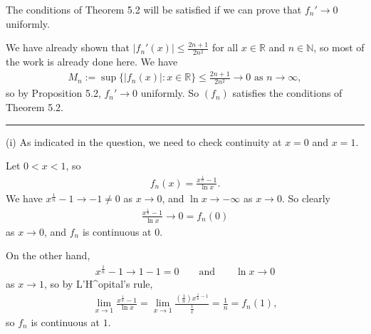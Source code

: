 \documentclass[letterpaper,10pt,english]{jupyterBook}
\begin{document}
The conditions of Theorem 5.2 will be satisfied if we can prove that \(f_n'\rightarrow 0\) uniformly.

We have already shown that \(|f_n'(x)|\leq \frac{2n+1}{2n^2}\) for all \(x\in\mathbb{R}\) and \(n\in\mathbb{N}\), so most of the work is already done here. We have
\begin{equation*}
\begin{split}
M_n := \sup\{|f_n(x)|:x\in\mathbb{R}\} \leq \frac{2n+1}{2n^2}\rightarrow 0 \text{ as } n\rightarrow\infty,
\end{split}
\end{equation*}
\sphinxAtStartPar
so by Proposition 5.2, \(f_n'\rightarrow 0\) uniformly. So \((f_n)\) satisfies the conditions of Theorem 5.2.


\bigskip\hrule\bigskip


\sphinxAtStartPar
{\hyperref[\detokenize{Problems:id59}]{}}
(i) As indicated in the question, we need to check continuity at \(x=0\) and \(x=1\).

Let \(0<x<1\), so
\begin{equation*}
\begin{split}
f_n(x) = \frac{x^{\frac{1}{n}}-1}{\ln x}.
\end{split}
\end{equation*}
\sphinxAtStartPar
We have \(x^{\frac{1}{n}} -1 \rightarrow -1 \neq 0\) as \(x\rightarrow 0\), and \(\ln x\rightarrow -\infty\) as \(x\rightarrow 0\). So clearly
\begin{equation*}
\begin{split}
\frac{x^{\frac{1}{n}}-1}{\ln x} \rightarrow 0 =f_n(0)
\end{split}
\end{equation*}
\sphinxAtStartPar
as \(x\rightarrow 0\), and \(f_n\) is continuous at \(0\).

On the other hand,
\begin{equation*}
\begin{split}
x^{\frac{1}{n}} -1 \rightarrow 1-1=0 \qquad \text{and}\qquad \ln x\rightarrow 0
\end{split}
\end{equation*}
\sphinxAtStartPar
as \(x\rightarrow 1\), so by L’H\textasciicircum{}opital’s rule,
\begin{equation*}
\begin{split}
\lim_{x\rightarrow 1} \frac{x^{\frac{1}{n}} -1}{\ln x} = \lim_{x\rightarrow 1} \frac{\left(\frac{1}{n}\right)x^{\frac{1}{n}-1}}{\frac{1}{x}} = \frac{1}{n} = f_n(1),
\end{split}
\end{equation*}
\sphinxAtStartPar
so  \(f_n\) is continuous at \(1\).
\end{document}
